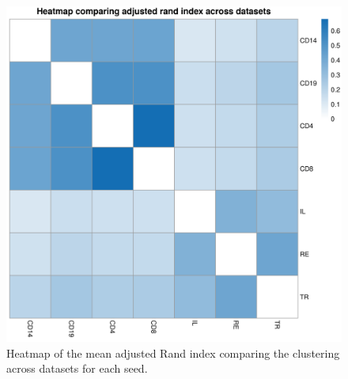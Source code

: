 \documentclass[12pt]{article} %
\begin{document}
	\newpage
	
	\begin{figure}[h]
		\centering
		\includegraphics[scale=0.75]{Images/Biology_data/Set_1000/All_datasets/Arandi_heatmap.png}
		\caption{Heatmap of the mean adjusted Rand index comparing the clustering across datasets for each seed.}
		\label{fig:results:cedar_2:mdi_adj_rand_ind_heatmap}
	\end{figure}
	
	\newpage
	
\end{document}
